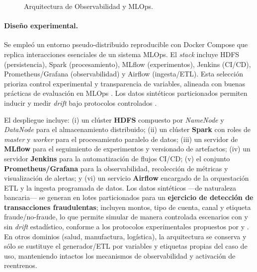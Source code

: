 \begin{figure}[htbp]
{
}
\caption{Arquitectura de Observabilidad y MLOps.}
\label{fig:oe1-flujo}
\end{figure}


\paragraph{Diseño experimental.}
Se empleó un entorno pseudo-distribuido reproducible con Docker Compose que replica interacciones esenciales de un sistema MLOps. El \emph{stack} incluye HDFS (persistencia), Spark (procesamiento), MLflow (experimentos), Jenkins (CI/CD), Prometheus/Grafana (observabilidad) y Airflow (ingesta/ETL). Esta selección prioriza control experimental y transparencia de variables, alineada con buenas prácticas de evaluación en MLOps \citep{Amershi2019,Berberi2025}. Los datos sintéticos particionados permiten inducir y medir \textit{drift} bajo protocolos controlados \citep{Lu2019,Chawla2021}.

El despliegue incluye: (i) un clúster \textbf{HDFS} compuesto por \textit{NameNode} y \textit{DataNode} para el almacenamiento distribuido; (ii) un clúster \textbf{Spark} con roles de \textit{master} y \textit{worker} para el procesamiento paralelo de datos; (iii) un servidor de \textbf{MLflow} para el seguimiento de experimentos y versionado de artefactos; (iv) un servidor \textbf{Jenkins} para la automatización de flujos CI/CD; (v) el conjunto \textbf{Prometheus/Grafana} para la observabilidad, recolección de métricas y visualización de alertas; y (vi) un servicio \textbf{Airflow} encargado de la orquestación ETL y la ingesta programada de datos.  
Los datos sintéticos —de naturaleza bancaria— se generan en lotes particionados para un \textbf{ejercicio de detección de transacciones fraudulentas}; incluyen montos, tipo de cuenta, canal y etiqueta fraude/no-fraude, lo que permite simular de manera controlada escenarios con y sin \textit{drift} estadístico, conforme a los protocolos experimentales propuestos por \citet{Agarwal2023} y \citet{Chatterjee2023}. En otros dominios (salud, manufactura, logística), la arquitectura se conserva y sólo se sustituye el generador/ETL por variables y etiquetas propias del caso de uso, manteniendo intactos los mecanismos de observabilidad y activación de reentrenos.

